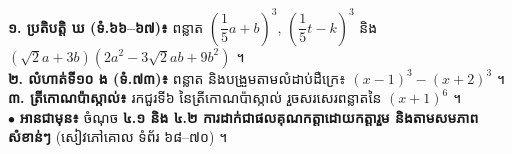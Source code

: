 \documentclass[a4paper,10pt]{article}
\begin{document}
\begin{tcolorbox}[enhanced, sharp corners, colback=white, colframe=black, boxrule=0.8pt, borderline={0.6pt}{2pt}{dashed}, top=3pt, bottom=3pt, left=6pt, right=6pt]
  \textbf{១. ប្រតិបត្តិ ឃ (ទំ.៦៦--៦៧)៖} ពន្លាត $\left(\dfrac{1}{5}a + b\right)^3$, $\left(\dfrac{1}{5}t - k\right)^3$ និង $(\sqrt{2}a + 3b)(2a^2 - 3\sqrt{2}ab + 9b^2)$ ។\\[1.5pt]
  \textbf{២. លំហាត់ទី១០ ង (ទំ.៧៣)៖} ពន្លាត និងបង្រួមតាមលំដាប់ដឺក្រេ៖ $(x - 1)^3 - (x + 2)^3$ ។\\[1.5pt]
  \textbf{៣. ត្រីកោណប៉ាស្កាល់៖} រកជួរទី៦ នៃត្រីកោណប៉ាស្កាល់ រួចសរសេរពន្លាតនៃ $(x + 1)^6$ ។\\[1.5pt]
  $\bullet$ \textbf{អានជាមុន៖} ចំណុច \textbf{៤.១ និង ៤.២ ការដាក់ជាផលគុណកត្តាដោយកត្តារួម និងតាមសមភាពសំខាន់ៗ} (សៀវភៅគោល ទំព័រ ៦៨--៧០) ។
\end{tcolorbox}
\end{document}
